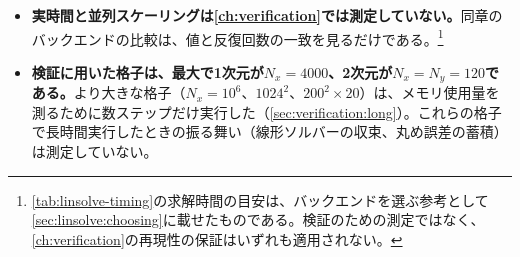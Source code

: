 \begin{itemize}
  \item \textbf{実時間と並列スケーリングは\cref{ch:verification}では測定していない。}同章のバックエンドの比較は、値と反復回数の一致を見るだけである。\footnote{\cref{tab:linsolve-timing}の求解時間の目安は、バックエンドを選ぶ参考として\cref{sec:linsolve:choosing}に載せたものである。検証のための測定ではなく、\cref{ch:verification}の再現性の保証はいずれも適用されない。}
  \item \textbf{検証に用いた格子は、最大で1次元が$N_x = 4000$、2次元が$N_x = N_y = 120$である。}より大きな格子（$N_x = 10^{6}$、$1024^{2}$、$200^{2} \times 20$）は、メモリ使用量を測るために数ステップだけ実行した（\cref{sec:verification:long}）。これらの格子で長時間実行したときの振る舞い（線形ソルバーの収束、丸め誤差の蓄積）は測定していない。
\end{itemize}
